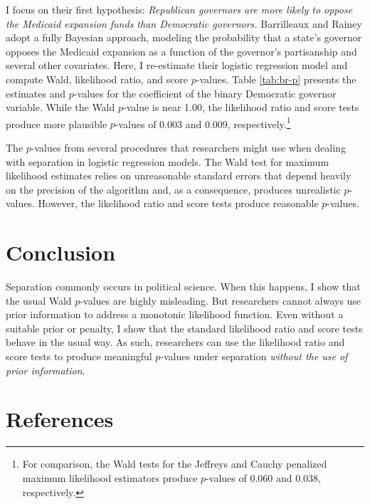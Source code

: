 \documentclass[
]{article}
\begin{document}
I focus on their first hypothesis: \emph{Republican governors are more
likely to oppose the Medicaid expansion funds than Democratic
governors.} Barrilleaux and Rainey adopt a fully Bayesian approach,
modeling the probability that a state's governor opposes the Medicaid
expansion as a function of the governor's partisanship and several other
covariates. Here, I re-estimate their logistic regression model and
compute Wald, likelihood ratio, and score \(p\)-values. Table
\ref{tab:br-p} presents the estimates and \(p\)-values for the
coefficient of the binary Democratic governor variable. While the Wald
\(p\)-value is near 1.00, the likelihood ratio and score tests produce
more plausible \(p\)-values of 0.003 and 0.009, respectively.\footnote{For
  comparison, the Wald tests for the Jeffreys and Cauchy penalized
  maximum likelihood estimators produce \(p\)-values of 0.060 and 0.038,
  respectively.}

\renewcommand{\captiontext}{}
\renewcommand{\notetext}{The $p$-values from several procedures that researchers might use when dealing with separation in logistic regression models. The Wald test for maximum likelihood estimates relies on unreasonable standard errors that depend heavily on the precision of the algorithm and, as a consequence, produces unrealistic $p$-values. However, the likelihood ratio and score tests produce reasonable $p$-values.}
\begin{table}[!h]
\caption{\label{tab:br-p}}
\centering
\fontsize{10}{12}\selectfont
\begin{threeparttable}

\begin{tablenotes}[para]
The $p$-values from several procedures that researchers might use when dealing with separation in logistic regression models. The Wald test for maximum likelihood estimates relies on unreasonable standard errors that depend heavily on the precision of the algorithm and, as a consequence, produces unrealistic $p$-values. However, the likelihood ratio and score tests produce reasonable $p$-values.
\end{tablenotes}
\end{threeparttable}
\end{table}

\hypertarget{conclusion}{%
\section{Conclusion}\label{conclusion}}

Separation commonly occurs in political science. When this happens, I
show that the usual Wald \(p\)-values are highly misleading. But
researchers cannot always use prior information to address a monotonic
likelihood function. Even without a suitable prior or penalty, I show
that the standard likelihood ratio and score tests behave in the usual
way. As such, researchers can use the likelihood ratio and score tests
to produce meaningful \(p\)-values under separation \emph{without the
use of prior information}.

\newpage

\hypertarget{references}{%
\section{References}\label{references}}

\setlength{\parindent}{-0.2in}
\setlength{\leftskip}{0.2in}
\setlength{\parskip}{8pt}

\noindent
\end{document}
